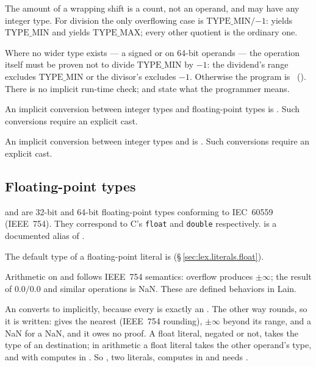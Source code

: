 The amount of a wrapping shift  is a count, not an operand, and may have any
integer type.  For division the only overflowing case is
\(\mathrm{TYPE\_MIN} / {-1}\): \lain{/\%} yields \(\mathrm{TYPE\_MIN}\) and \lain{/|}
yields \(\mathrm{TYPE\_MAX}\); every other quotient is the ordinary one.

\begin{constraint}
  Where no wider type exists --- a signed \lain{/} or \lain{\%} on 64-bit operands --- the
  operation itself must be proven not to divide \(\mathrm{TYPE\_MIN}\) by \({-1}\): the
  dividend's range excludes \(\mathrm{TYPE\_MIN}\) or the divisor's excludes \({-1}\).
  Otherwise the program is \illformed{}~().  There is no implicit run-time
  check; \lain{/\%} and \lain{/|} state what the programmer means.
\end{constraint}

\begin{constraint}
  An implicit conversion between integer types and floating-point types is
  \illformed{}.  Such conversions require an explicit  cast.
\end{constraint}

\begin{constraint}
  An implicit conversion between integer types and  is
  \illformed{}.  Such conversions require an explicit  cast.
\end{constraint}

\subsection{Floating-point types}
\label{sec:types.float}

\pnum
{} and  are 32-bit and 64-bit floating-point types
conforming to IEC~60559 (IEEE~754).  They correspond to C's \texttt{float}
and \texttt{double} respectively.   is a documented alias
of .

\pnum
The default type of a floating-point literal is 
(\S\,\ref{sec:lex.literals.float}).

\pnum
Arithmetic on  and  follows IEEE~754 semantics:
overflow produces $\pm\infty$; the result of $0.0/0.0$ and similar
operations is NaN.  These are defined behaviors in Lain.

\pnum
An  converts to  implicitly, because every  is exactly an
.  The other way rounds, so it is written:  gives the nearest
 (IEEE~754 rounding), $\pm\infty$ beyond its range, and a NaN for a NaN, and it owes no
proof.  A float literal, negated or not, takes the type of an  destination; in
arithmetic a float literal takes the other operand's type, and  with 
computes in .  So , two literals, computes in 
and needs .

